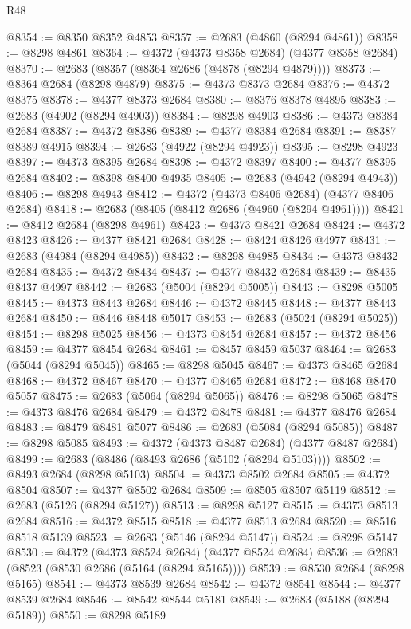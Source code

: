 \begin{lexlean}{R48}
\begin{coremodule}
@8354 := @8350 @8352 @4853
@8357 := @2683 (@4860 (@8294 @4861))
@8358 := @8298 @4861
@8364 := @4372 (@4373 @8358 @2684) (@4377 @8358 @2684)
@8370 := @2683 (@8357 (@8364 @2686 (@4878 (@8294 @4879))))
@8373 := @8364 @2684 (@8298 @4879)
@8375 := @4373 @8373 @2684
@8376 := @4372 @8375
@8378 := @4377 @8373 @2684
@8380 := @8376 @8378 @4895
@8383 := @2683 (@4902 (@8294 @4903))
@8384 := @8298 @4903
@8386 := @4373 @8384 @2684
@8387 := @4372 @8386
@8389 := @4377 @8384 @2684
@8391 := @8387 @8389 @4915
@8394 := @2683 (@4922 (@8294 @4923))
@8395 := @8298 @4923
@8397 := @4373 @8395 @2684
@8398 := @4372 @8397
@8400 := @4377 @8395 @2684
@8402 := @8398 @8400 @4935
@8405 := @2683 (@4942 (@8294 @4943))
@8406 := @8298 @4943
@8412 := @4372 (@4373 @8406 @2684) (@4377 @8406 @2684)
@8418 := @2683 (@8405 (@8412 @2686 (@4960 (@8294 @4961))))
@8421 := @8412 @2684 (@8298 @4961)
@8423 := @4373 @8421 @2684
@8424 := @4372 @8423
@8426 := @4377 @8421 @2684
@8428 := @8424 @8426 @4977
@8431 := @2683 (@4984 (@8294 @4985))
@8432 := @8298 @4985
@8434 := @4373 @8432 @2684
@8435 := @4372 @8434
@8437 := @4377 @8432 @2684
@8439 := @8435 @8437 @4997
@8442 := @2683 (@5004 (@8294 @5005))
@8443 := @8298 @5005
@8445 := @4373 @8443 @2684
@8446 := @4372 @8445
@8448 := @4377 @8443 @2684
@8450 := @8446 @8448 @5017
@8453 := @2683 (@5024 (@8294 @5025))
@8454 := @8298 @5025
@8456 := @4373 @8454 @2684
@8457 := @4372 @8456
@8459 := @4377 @8454 @2684
@8461 := @8457 @8459 @5037
@8464 := @2683 (@5044 (@8294 @5045))
@8465 := @8298 @5045
@8467 := @4373 @8465 @2684
@8468 := @4372 @8467
@8470 := @4377 @8465 @2684
@8472 := @8468 @8470 @5057
@8475 := @2683 (@5064 (@8294 @5065))
@8476 := @8298 @5065
@8478 := @4373 @8476 @2684
@8479 := @4372 @8478
@8481 := @4377 @8476 @2684
@8483 := @8479 @8481 @5077
@8486 := @2683 (@5084 (@8294 @5085))
@8487 := @8298 @5085
@8493 := @4372 (@4373 @8487 @2684) (@4377 @8487 @2684)
@8499 := @2683 (@8486 (@8493 @2686 (@5102 (@8294 @5103))))
@8502 := @8493 @2684 (@8298 @5103)
@8504 := @4373 @8502 @2684
@8505 := @4372 @8504
@8507 := @4377 @8502 @2684
@8509 := @8505 @8507 @5119
@8512 := @2683 (@5126 (@8294 @5127))
@8513 := @8298 @5127
@8515 := @4373 @8513 @2684
@8516 := @4372 @8515
@8518 := @4377 @8513 @2684
@8520 := @8516 @8518 @5139
@8523 := @2683 (@5146 (@8294 @5147))
@8524 := @8298 @5147
@8530 := @4372 (@4373 @8524 @2684) (@4377 @8524 @2684)
@8536 := @2683 (@8523 (@8530 @2686 (@5164 (@8294 @5165))))
@8539 := @8530 @2684 (@8298 @5165)
@8541 := @4373 @8539 @2684
@8542 := @4372 @8541
@8544 := @4377 @8539 @2684
@8546 := @8542 @8544 @5181
@8549 := @2683 (@5188 (@8294 @5189))
@8550 := @8298 @5189

\end{coremodule}
\end{lexlean}
